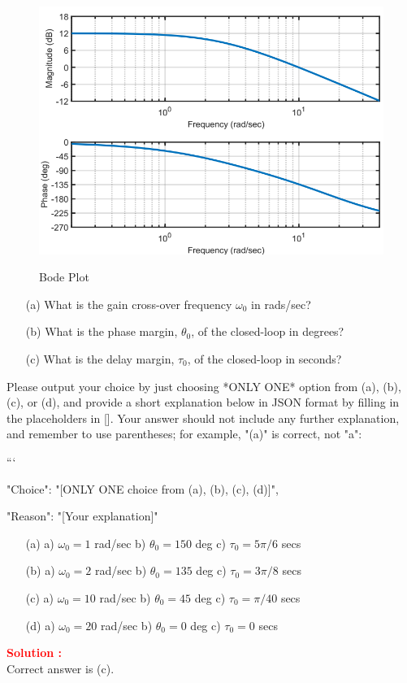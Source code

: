 \documentclass[12pt]{article}
\begin{document}
\begin{figure}[h]
    \centering
    \includegraphics[width=\textwidth]{figs/6.4.png}
    \label{fig:bode-88}
    \caption{Bode Plot}
\end{figure}

\begin{itemize}
    \item[(a)] What is the gain cross-over frequency $\omega_0$ in rads/sec?
    \item[(b)] What is the phase margin, $\theta_0$, of the closed-loop in degrees?
    \item[(c)] What is the delay margin, $\tau_0$, of the closed-loop in seconds?
\end{itemize}
Please output your choice by just choosing *ONLY ONE* option from (a), (b), (c), or (d), and provide a short explanation below in JSON format by filling in the placeholders in []. Your answer should not include any further explanation, and remember to use parentheses; for example, "(a)" is correct, not "a":

```
{

"Choice": "[ONLY ONE choice from (a), (b), (c), (d)]",

"Reason": "[Your explanation]"

}

\begin{itemize}
    \item[(a)] a) $\omega_0 = 1$ rad/sec b) $\theta_0 = 150 $ deg c) $\tau_0 = 5\pi/ 6 $ secs
    \item[(b)] a) $\omega_0 = 2$ rad/sec b) $\theta_0 = 135 $ deg c) $\tau_0 = 3\pi/ 8 $ secs
    \item[(c)] a) $\omega_0 = 10$ rad/sec b) $\theta_0 = 45 $ deg c) $\tau_0 = \pi/ 40 $ secs
    \item[(d)] a) $\omega_0 = 20$ rad/sec b) $\theta_0 = 0 $ deg c) $\tau_0 = 0$ secs
\end{itemize}
\textbf{\textcolor{red}{Solution :}}\\
Correct answer is (c).\\
\end{document}
